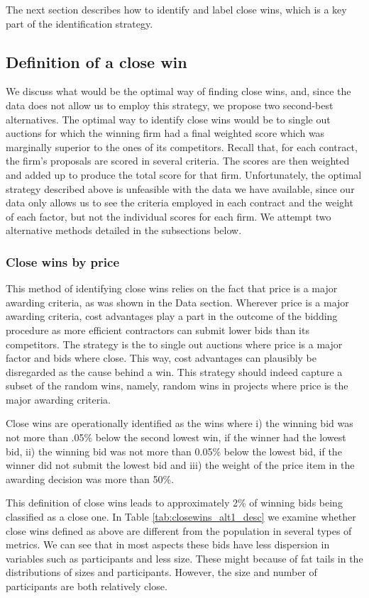 The next section describes how to identify and label close wins, which is a key part of the identification strategy.

\subsection{Definition of a close win}
\label{section:findclosewins}
We discuss what would be the optimal way of finding close wins, and, since the data does not allow us to employ this strategy, we propose two second-best alternatives.
The optimal way to identify close wins would be to single out auctions for which the winning firm had a final weighted score which was marginally superior to the ones of its competitors.  Recall that, for each contract, the  firm's proposals are scored in several criteria. The scores are then weighted and added up to produce the total score for that firm. Unfortunately, the optimal strategy described above is unfeasible with the data we have available, since our data only allows us to see the criteria employed in each contract and the weight of each factor, but not the individual scores for each firm. We attempt two alternative methods detailed in the subsections below.

\subsubsection{Close wins by price}
This method of identifying close wins relies on the fact that price is a major awarding criteria, as was shown in the Data section. Wherever price is a major awarding criteria, cost advantages play a part in the outcome of the bidding procedure as more efficient contractors can submit lower bids than its competitors. The strategy is the to single out auctions where price is a major factor and bids where close. This way, cost advantages can plausibly be disregarded as the cause behind a win. This strategy should indeed capture a subset of the random wins, namely, random wins in projects where price is the major awarding criteria.

Close wins are operationally identified as the wins where i) the winning bid was not more than .05\% below the second lowest win, if the winner had the lowest bid, ii) the winning bid was not more than 0.05\% below the lowest bid, if the winner did not submit the lowest bid and iii) the weight of the price item in the awarding decision was more than 50\%.

This definition of close wins leads to approximately 2\% of winning bids being classified as a close one. In Table \ref{tab:closewins_alt1_desc} we examine whether close wins defined as above are different from the population in several types of metrics. We can see that in most aspects these bids have less dispersion in variables such as participants and less size. These might because of fat tails in the distributions of sizes and participants. However, the size and number of participants are both relatively close.

